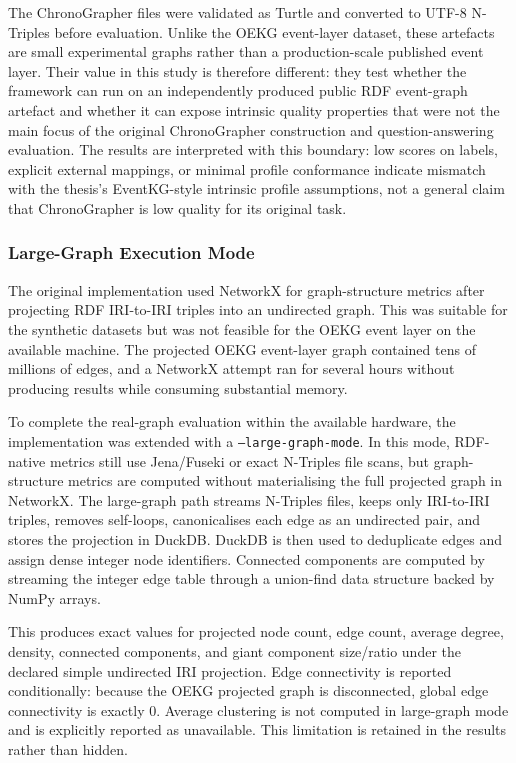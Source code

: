 The ChronoGrapher files were validated as Turtle and converted to UTF-8 N-Triples before evaluation. Unlike the OEKG event-layer dataset, these artefacts are small experimental graphs rather than a production-scale published event layer. Their value in this study is therefore different: they test whether the framework can run on an independently produced public RDF event-graph artefact and whether it can expose intrinsic quality properties that were not the main focus of the original ChronoGrapher construction and question-answering evaluation. The results are interpreted with this boundary: low scores on labels, explicit external mappings, or minimal profile conformance indicate mismatch with the thesis's EventKG-style intrinsic profile assumptions, not a general claim that ChronoGrapher is low quality for its original task.

\subsubsection{Large-Graph Execution Mode}

The original implementation used NetworkX for graph-structure metrics after projecting RDF IRI-to-IRI triples into an undirected graph. This was suitable for the synthetic datasets but was not feasible for the OEKG event layer on the available machine. The projected OEKG event-layer graph contained tens of millions of edges, and a NetworkX attempt ran for several hours without producing results while consuming substantial memory.

To complete the real-graph evaluation within the available hardware, the implementation was extended with a \texttt{--large-graph-mode}. In this mode, RDF-native metrics still use Jena/Fuseki or exact N-Triples file scans, but graph-structure metrics are computed without materialising the full projected graph in NetworkX. The large-graph path streams N-Triples files, keeps only IRI-to-IRI triples, removes self-loops, canonicalises each edge as an undirected pair, and stores the projection in DuckDB. DuckDB is then used to deduplicate edges and assign dense integer node identifiers. Connected components are computed by streaming the integer edge table through a union-find data structure backed by NumPy arrays.

This produces exact values for projected node count, edge count, average degree, density, connected components, and giant component size/ratio under the declared simple undirected IRI projection. Edge connectivity is reported conditionally: because the OEKG projected graph is disconnected, global edge connectivity is exactly 0. Average clustering is not computed in large-graph mode and is explicitly reported as unavailable. This limitation is retained in the results rather than hidden.

